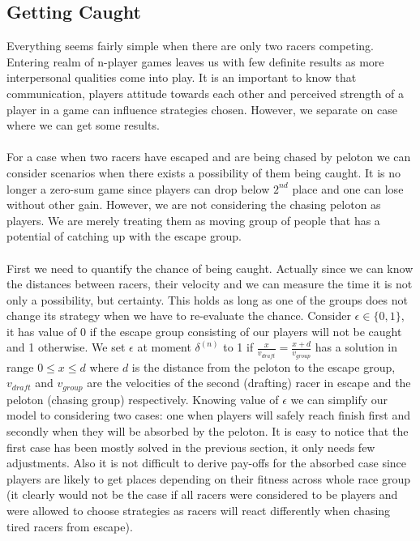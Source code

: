 \documentclass[10pt, a4paper]{report}
\begin{document}
\subsection{Getting Caught}\label{subsec:getcaught}
Everything seems fairly simple when there are only two racers competing. Entering realm of n-player games leaves us with few definite results as more interpersonal qualities come into play. It is an important to know that communication, players attitude towards each other and perceived strength of a player in a game can influence strategies chosen. However, we separate on case where we can get some results.
\\\\
For a case when two racers have escaped and are being chased by peloton we can consider scenarios when there exists a possibility of them being caught. It is no longer a zero-sum game since players can drop below $2^{nd}$ place and one can lose without other gain. However, we are not considering the chasing peloton as players. We are merely treating them as moving group of people that has a potential of catching up with the escape group.
\\\\
First we need to quantify the chance of being caught. Actually since we can know the distances between racers, their velocity and we can measure the time it is not only a possibility, but certainty. This holds as long as one of the groups does not change its strategy when we have to re-evaluate the chance. Consider $\epsilon \in \{0,1\}$, it has value of 0 if the escape group consisting of our players will not be caught and 1 otherwise. We set $\epsilon$ at moment $\delta^{(n)}$ to 1 if $\frac{x}{v_{draft}}=\frac{x+d}{v_{group}}$ has a solution in range $0\le x\le d$ where $d$ is the distance from the peloton to the escape group, $v_{draft}$ and $v_{group}$ are the velocities of the second (drafting) racer in escape and the peloton (chasing group) respectively. Knowing value of $\epsilon$ we can simplify our model to considering two cases: one when players will safely reach finish first and secondly when they will be absorbed by the peloton. It is easy to notice that the first case has been mostly solved in the previous section, it only needs few adjustments. Also it is not difficult to derive pay-offs for the absorbed case since players are likely to get places depending on their fitness across whole race group (it clearly would not be the case if all racers were considered to be players and were allowed to choose strategies as racers will react differently when chasing tired racers from escape).
\end{document}
